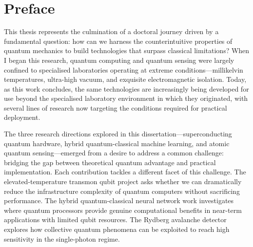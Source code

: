 \chapter*{Preface}

This thesis represents the culmination of a doctoral journey driven by a fundamental question: how can we harness the counterintuitive properties of quantum mechanics to build technologies that surpass classical limitations? When I began this research, quantum computing and quantum sensing were largely confined to specialised laboratories operating at extreme conditions---millikelvin temperatures, ultra-high vacuum, and exquisite electromagnetic isolation. Today, as this work concludes, the same technologies are increasingly being developed for use beyond the specialised laboratory environment in which they originated, with several lines of research now targeting the conditions required for practical deployment.

The three research directions explored in this dissertation---superconducting quantum hardware, hybrid quantum-classical machine learning, and atomic quantum sensing---emerged from a desire to address a common challenge: bridging the gap between theoretical quantum advantage and practical implementation. Each contribution tackles a different facet of this challenge. The elevated-temperature transmon qubit project asks whether we can dramatically reduce the infrastructure complexity of quantum computers without sacrificing performance. The hybrid quantum-classical neural network work investigates where quantum processors provide genuine computational benefits in near-term applications with limited qubit resources. The Rydberg avalanche detector explores how collective quantum phenomena can be exploited to reach high sensitivity in the single-photon regime.

